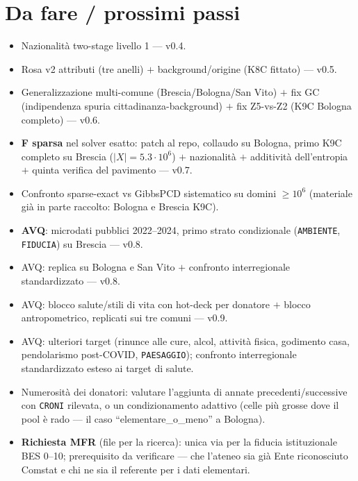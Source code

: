 \documentclass[11pt,a4paper]{article}
\newcommand{\code}[1]{\texttt{#1}}
\begin{document}
\section{Da fare / prossimi passi}
\label{sec:todo}
\begin{itemize}[leftmargin=*,itemsep=1pt]
  \item[$\boxtimes$] Nazionalit\`a two-stage livello 1 --- v0.4.
  \item[$\boxtimes$] Rosa v2 attributi (tre anelli) $+$ background/origine
  (K8C fittato) --- v0.5.
  \item[$\boxtimes$] Generalizzazione multi-comune (Brescia/Bologna/San
  Vito) $+$ fix GC (indipendenza spuria cittadinanza-background) $+$ fix
  Z5-vs-Z2 (K9C Bologna completo) --- v0.6.
  \item[$\boxtimes$] \textbf{F sparsa} nel solver esatto: patch al repo,
  collaudo su Bologna, primo K9C completo su Brescia
  ($|X|=5.3\cdot10^6$) $+$ nazionalit\`a $+$ additivit\`a dell'entropia
  $+$ quinta verifica del pavimento --- v0.7.
  \item[$\square$] Confronto sparse-exact vs GibbsPCD sistematico su
  domini $\ge10^6$ (materiale gi\`a in parte raccolto: Bologna e Brescia
  K9C).
  \item[$\boxtimes$] \textbf{AVQ}: microdati pubblici 2022--2024, primo
  strato condizionale (\code{AMBIENTE}, \code{FIDUCIA}) su Brescia --- v0.8.
  \item[$\boxtimes$] AVQ: replica su Bologna e San Vito $+$ confronto
  interregionale standardizzato --- v0.8.
  \item[$\boxtimes$] AVQ: blocco salute/stili di vita con hot-deck per
  donatore $+$ blocco antropometrico, replicati sui tre comuni --- v0.9.
  \item[$\square$] AVQ: ulteriori target (rinunce alle cure, alcol,
  attivit\`a fisica, godimento casa, pendolarismo post-COVID,
  \code{PAESAGGIO}); confronto interregionale standardizzato esteso ai
  target di salute.
  \item[$\square$] Numerosit\`a dei donatori: valutare l'aggiunta di
  annate precedenti/successive con \code{CRONI} rilevata, o un
  condizionamento adattivo (celle pi\`u grosse dove il pool \`e rado ---
  il caso ``elementare\_o\_meno'' a Bologna).
  \item[$\square$] \textbf{Richiesta MFR} (file per la ricerca): unica via
  per la fiducia istituzionale BES 0--10; prerequisito da verificare ---
  che l'ateneo sia gi\`a Ente riconosciuto Comstat e chi ne sia il
  referente per i dati elementari.

\end{itemize}
\end{document}
